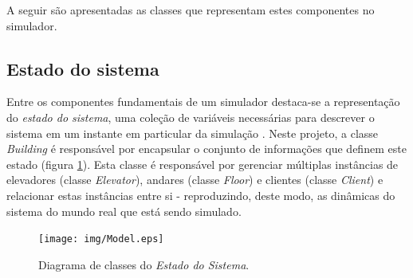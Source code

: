 A seguir são apresentadas as classes que representam estes componentes no
simulador.

\subsection{Estado do sistema}

Entre os componentes fundamentais de um simulador destaca-se a representação do
\textit{estado do sistema}, uma coleção de variáveis necessárias para descrever
o sistema em um instante em particular da simulação \cite{Law}. Neste projeto, a
classe \textit{Building} é responsável por encapsular o conjunto de informações
que definem este estado (figura \ref{fig:diagram:model}). Esta classe é
responsável por gerenciar múltiplas instâncias de elevadores (classe
\textit{Elevator}), andares (classe \textit{Floor}) e clientes (classe
\textit{Client}) e relacionar estas instâncias entre si - reproduzindo, deste
modo, as dinâmicas do sistema do mundo real que está sendo simulado.

\begin{figure}[htb!]
  \centering
  \texttt{[image: img/Model.eps]}
  \caption{Diagrama de classes do \textit{Estado do Sistema}.}
\label{fig:diagram:model}
\end{figure}

